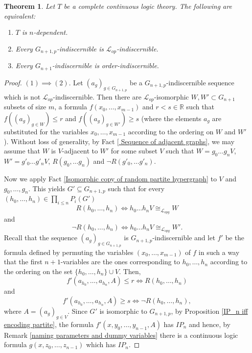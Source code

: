 \documentclass{amsart}
\newtheorem{teor}{Theorem}[section]
\newtheorem{external claim}[teor]{Claim}
\newcommand{\mL}{\mathcal{L}}
\begin{document}
\begin{teor} \label{n-dep and collapsing}
    Let $T$ be a complete continuous logic theory. The following are equivalent:
    \begin{enumerate}
        \item $T$ is $n$-dependent.
        \item Every $G_{n+1,p}$-indiscernible is $\mL_{op}$-indiscernible.
        \item Every $G_{n+1}$-indiscernible is order-indiscernible.
    \end{enumerate}
\end{teor}
    \begin{proof}
            $(1)\implies(2)$. Let $(a_g)_{g\in G_{n+1,p}}$ be a $G_{n+1,p}$-indiscernible sequence which is not $\mL_{op}$-indiscernible. Then there are $\mL_{op}$-isomorphic $W,W'\subset G_{n+1}$ subsets of size $m$, a formula $f(x_0,\dots,x_{m-1})$ and $r<s\in \mathbb{R}$ such that $f( (a_g)_{g\in W}) \leq r$ and $f( (a_g)_{g\in W'})\geq s$ (where the elements $a_g$ are substituted for the variables $x_0,\dots,x_{m-1}$ according to the ordering on $W$ and $W'$). Without loss of generality, by Fact \ref{ Sequence of adjacent graphs}, we may assume that $W$ is $V$-adjacent to $W'$ for some subset $V$ such that $W=g_0\dots g_n V$, $W'=g'_0\dots g'_n V$, $R(g_0,\dots g_n)$ and $\neg R(g'_0,\dots g'_n)$. 

            Now we apply Fact \ref{Isomorphic copy of random partite hypergraph} to $V$ and $g_0,\dots,g_n$. This yields $G'\subseteq G_{n+1,p}$ such that for every $(h_0,\dots,h_n)\in \prod_{i\leq n} P_i(G')$ $$ R(h_{0},\dots,h_{n}) \iff h_0\dots h_n V\cong_{\mL_{opg}}W $$ and $$ \neg R(h_0,\dots,h_n) \iff h_0\dots h_nV\cong_{\mL_{opg}}W'.$$ Recall that the sequence $(a_g)_{g\in G_{n+1,p}}$ is $G_{n+1,p}$-indiscernible and let $f'$ be the formula defined by permuting the variables $(x_0,\dots,x_{m-1})$ of $f$ in such a way that the first $n+1$-variables are the ones corresponding to $h_0,\dots,h_n$ according to the ordering on the set $\{h_0,\dots,h_n\}\cup V$. Then,
            $$ f'(a_{h_0},\dots, a_{h_n},A)\leq r \iff R(h_{0},\dots,h_{n})$$
            and
            $$f'(a_{h_0},\dots, a_{h_n},A)\geq s \iff \neg R(h_{0},\dots,h_{n}),$$ where $A=(a_g)_{g\in V}$. Since $G'$ is isomorphic to $G_{n+1,p}$, by Proposition \ref{IP_n iff encoding partite}, the formula $f'(x,y_{0},\dots, y_{n-1},A)$ has $IP_n$ and hence, by Remark \ref{naming parameters and dummy variables} there is a continuous logic formula $g(x,z_{0},\dots, z_{n-1})$ which has $IP_n$.
            

\end{proof}
\end{document}
